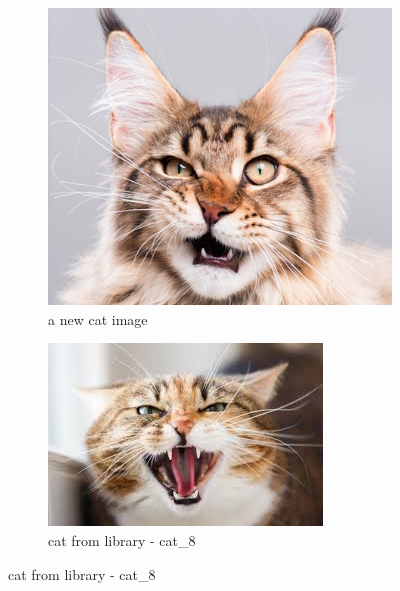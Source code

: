 \documentclass[a4paper]{iacas}
\begin{document}
\vskip 0.1in
\begin{figure}[!htbp]
	\begin{subfigure}{0.4\linewidth}
		\centering
		\includegraphics[width=\linewidth,scale=0.8]{imgs/cat.jpg}
		\caption{a new cat image}
	\end{subfigure}
	\begin{subfigure}{0.4\linewidth}
		\centering
		\includegraphics[width=\linewidth,scale=0.8]{imgs/cat_8.jpg}
		\caption{cat from library - cat\_8}
	\end{subfigure}


\end{figure}
\end{document}

